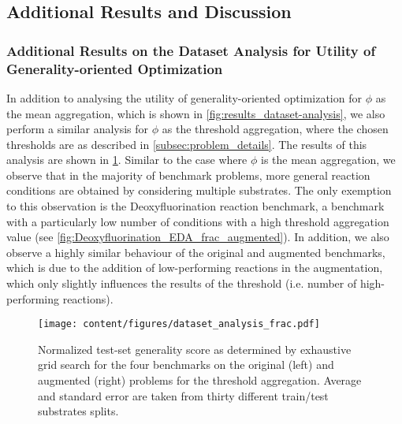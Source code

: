 \subsection{Additional Results and Discussion}\label{subsec:add_results}

\subsubsection{Additional Results on the Dataset Analysis for Utility of Generality-oriented Optimization} \label{subsubsec:add_results_data-analysis}

In addition to analysing the utility of generality-oriented optimization for $\phi$ as the mean aggregation, which is shown in \cref{fig:results_dataset-analysis}, we also perform a similar analysis for $\phi$ as the threshold aggregation, where the chosen thresholds are as described in \cref{subsec:problem_details}.
The results of this analysis are shown in \cref{fig:results_dataset-analysis_frac}.
Similar to the case where $\phi$ is the mean aggregation, we observe that in the majority of benchmark problems, more general reaction conditions are obtained by considering multiple substrates.
The only exemption to this observation is the Deoxyfluorination reaction benchmark, a benchmark with a particularly low number of conditions with a high threshold aggregation value (see \cref{fig:Deoxyfluorination_EDA_frac_augmented}).
In addition, we also observe a highly similar behaviour of the original and augmented benchmarks, which is due to the addition of low-performing reactions in the augmentation, which only slightly influences the results of the threshold (i.e. number of high-performing reactions).
\begin{figure}[t]
    \centering
    \texttt{[image: content/figures/dataset\_analysis\_frac.pdf]}
    \caption{
    Normalized test-set generality score as determined by exhaustive grid search for the four benchmarks on the original (left) and augmented (right) problems for the threshold aggregation. Average and standard error are taken from thirty different train/test substrates splits.
    }
    \label{fig:results_dataset-analysis_frac}
\end{figure}

